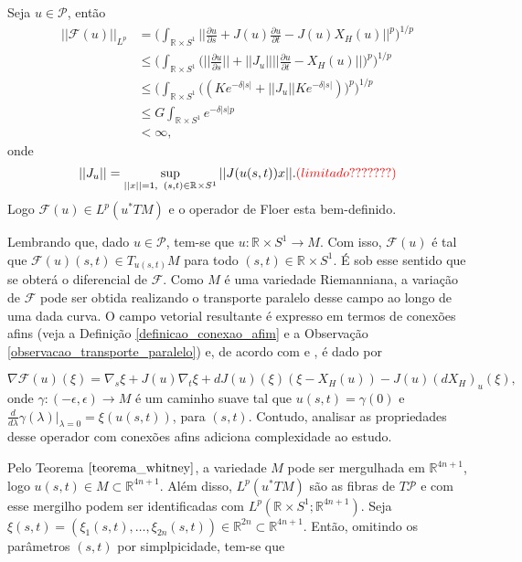 \documentclass[12pt]{book}
\newcommand{\bigparenteses}[1]{\Big( #1 \Big) }
\newcommand{\caminhosexponenciaisconectantesabrev}{\mathcal{P}}
\newcommand{\circulo}{S^{1}}
\newcommand{\derivada}[2]{\frac{d #1}{d #2}}
\newcommand{\derivadaparcial}[2]{\frac{\partial #1}{\partial #2}}
\newcommand{\espacoLp}[1]{L^{p}(#1)}
\newcommand{\espacoLpcontradominio}[2]{L^{p}(#1;#2)}
\newcommand{\espacotangenteponto}[2]{T_{#1}#2}
\newcommand{\operadorFloer}{\mathcal{F}}
\newcommand{\operadorFloerDefinicao}[1]{\derivadaparcial{#1}{s} + J(#1)\derivadaparcial{#1}{t} - J(#1)X_{H}(#1)}
\newcommand{\operadorFloerParametro}[1]{\mathcal{F}(#1)}
\newcommand{\operadorFloerPadrao}{\operadorFloerParametro{u}}
\newcommand{\norma}[1]{||#1||}
\newcommand{\normagrande}[1]{\Big|\Big|#1\Big|\Big|}
\newcommand{\normaLp}[1]{||#1||_{L^{p}}}
\newcommand{\normaLpdefinicao}[2]{ \Big(\int_{#2}#1^{p}\Big)^{1/p}}
\newcommand{\normagrandeLpdefinicao}[2]{ \normaLpdefinicao{\normagrande{#1}}{#2}}
\newcommand{\pullbackfibradotangente}[2]{#1^{*}T#2}
\newcommand{\pullbackfibradotangenteM}[1]{\pullbackfibradotangente{#1}{M}}
\newcommand{\pullbackfibradotangenteMpadrao}{\pullbackfibradotangente{u}{M}}
\newcommand{\retacartesianocirculo}{\real{} \times \circulo}
\newcommand{\real}[1]{\mathbb{R}^{#1}}
\newcommand{\alerta}[1]{{\color{red}#1}}
\begin{document}
	Seja $u \in \caminhosexponenciaisconectantesabrev$, então
	$$
	\begin{aligned}
	\normaLp{\operadorFloerPadrao} &= \normagrandeLpdefinicao{\operadorFloerDefinicao{u}}{\retacartesianocirculo}
	\\
	&\leq \normaLpdefinicao{\bigparenteses{\normagrande{\derivadaparcial{u}{s}} +\norma{J_{u}}\normagrande{\derivadaparcial{u}{t} - X_{H}(u)}}}{\retacartesianocirculo}
	\\
	&\leq \normaLpdefinicao{\bigparenteses{(Ke^{-\delta|s|} +\norma{J_{u}}Ke^{-\delta|s|})}}{\retacartesianocirculo}
	\\
	&\leq G \int_{\retacartesianocirculo}e^{-\delta|s|p}
	\\
	&< \infty,
	\end{aligned}	
	$$ 
	onde 
	$$
	\norma{J_{u}}=\sup_{\norma{x}=1, \;\; (s,t)\in \retacartesianocirculo}  \norma{J(u(s,t))x}.\alerta{(limitado???????)}
	$$
	Logo $\operadorFloerParametro{u} \in L^{p}(\pullbackfibradotangenteMpadrao)$ e o operador de Floer esta bem-definido.
	
	Lembrando que, dado $u \in \caminhosexponenciaisconectantesabrev$, tem-se que $u:\retacartesianocirculo\to M$. Com isso, $\operadorFloerParametro{u}$ é tal que $\operadorFloerParametro{u}(s, t) \in \espacotangenteponto{u(s,t)}{M}$ para todo $(s,t)\in \retacartesianocirculo$. É sob esse sentido que se obterá o diferencial de $\operadorFloer$. Como $M$ é uma variedade Riemanniana, a variação de $\operadorFloer$ pode ser obtida realizando o transporte paralelo desse campo ao longo de uma dada curva. O campo vetorial resultante é expresso em termos de conexões afins (veja a Definição \ref{definicao_conexao_afim} e a Observação \ref{observacao_transporte_paralelo}) e, de acordo com \cite{salamon_zehnder} e \cite{salamon_lecture}, é dado por
	
	$$
	\nabla\operadorFloerParametro{u}(\xi) = \nabla_{s}\xi + J(u)\nabla_{t}\xi + dJ(u)(\xi)(\xi - X_{H}(u)) - J(u)(dX_{H})_{u}(\xi),
	$$
	onde $\gamma: (-\epsilon, \epsilon) \to M$ é um caminho suave tal que $u(s,t) =\gamma(0)$ e $\derivada{}{\lambda}\gamma(\lambda)|_{\lambda=0}=\xi(u(s,t))$, para $(s,t)$. Contudo, analisar as propriedades desse operador com conexões afins adiciona complexidade ao estudo. 
	
	Pelo Teorema $\ref{teorema_whitney}$, a variedade $M$ pode ser mergulhada em $\real{4n+1}$, logo $u(s,t)\in M \subset \real{4n+1}$. Além disso, $\espacoLp{\pullbackfibradotangenteM{u}}$ são as fibras de $T\caminhosexponenciaisconectantesabrev$ e com esse mergilho podem ser identificadas com $\espacoLpcontradominio{\retacartesianocirculo}{\real{4n+1}}$. Seja $\xi(s,t)=(\xi_{1}(s,t), \dots, \xi_{2n}(s,t)) \in \real{2n }\subset \real{4n+1}$. Então, omitindo os parâmetros $(s,t)$ por simplpicidade, tem-se que
	
\end{document}
